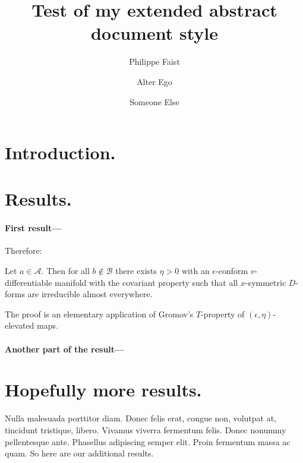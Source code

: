 \documentclass[
    papertype=a4paper,
]{phfextendedabstract}
\begin{document}
\title{Test of my extended abstract document style}
\author{Philippe Faist}
\author{Alter Ego}
\author{Someone Else}
\maketitle


\section{Introduction.}
\lipsum[1]

\section{Results.}
\lipsum[2]

\paragraph{First result---}
\lipsum[3]
Therefore:

\begin{theorem}
  Let $a\in \mathcal{A}$.  Then for all $b\notin\mathcal{B}$ there exists
  $\eta>0$ with an $\epsilon$-conform $v$-differentiable manifold with the
  covariant property such that all $x$-symmetric $D$-forms are irreducible
  almost everywhere.
\end{theorem}

The proof is an elementary application of Gromov's $T$-property of
$(\epsilon,\eta)$-elevated maps.

\paragraph{Another part of the result---}
\lipsum[4-5]


\section{Hopefully more results.}
Nulla malesuada porttitor diam. Donec felis erat, congue non, volutpat at,
tincidunt tristique, libero. Vivamus viverra fermentum felis. Donec nonummy
pellentesque ante. Phasellus adipiscing semper elit. Proin fermentum massa ac
quam.   So here are our additional results.
\end{document}
